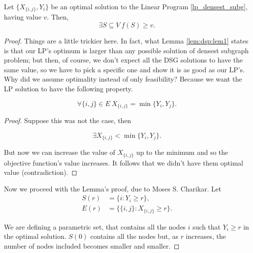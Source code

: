 \begin{lem}\label{lem:dsp_geq_lp}
Let $\{X_{\{i, j\}}, Y_i\}$ be an optimal solution to the Linear Program \ref{lp_densest_subg}, having value $v$. Then,
\begin{equation}
\exists S \subseteq V\ f(S) \geq v.
\end{equation}
\end{lem}
\begin{proof}
Things are a little trickier here. In fact, what Lemma \ref{lem:dsp:lem1} states is that our LP's optimum is larger than any possible solution of densest subgraph problem; but then, of course, we don't expect all the DSG solutions to have the same value, so we have to pick a specific one and show it is as good as our LP's. Why did we assume optimality instead of only feasibility? Because we want the LP solution to have the following property.

\begin{equation}\label{eq:dsp_opt_property}
\forall \{i, j\} \in E\ X_{\{i, j\}} = \min{\{Y_i, Y_j\}}.
\end{equation}
\begin{proof}
Suppose this was not the case, then

\begin{equation}
\exists X_{\{i, j\}} < \min{\{Y_i, Y_j\}}.
\end{equation}

But now we can increase the value of $X_{\{i, j\}}$ up to the minimum and so the objective function's value increases. It follows that we didn't have them optimal value (contradiction).
\end{proof}

 Now we proceed with the Lemma's proof, due to Moses S. Charikar. Let
 \begin{align}
     S(r) &= \{ i : Y_i \geq r\},\\
     E(r) &= \{ \{i, j\} : X_{\{i, j\}} \geq r\}.
 \end{align}
 
 We are defining a parametric set, that contains all the nodes $i$ such that $Y_i \geq r$ in the optimal solution. $S(0)$ contains all the nodes but, as $r$ increases, the number of nodes included becomes smaller and smaller.
 

\end{proof}
